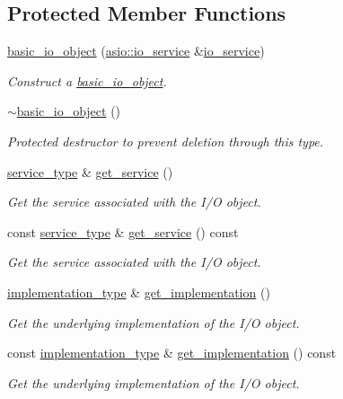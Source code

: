 \subsection*{Protected Member Functions}
\begin{DoxyCompactItemize}
\item 
\hyperlink{classasio_1_1basic__io__object_a26110041bd224aef06f6188ade817435}{basic\+\_\+io\+\_\+object} (\hyperlink{classasio_1_1io__service}{asio\+::io\+\_\+service} \&\hyperlink{classasio_1_1io__service}{io\+\_\+service})
\begin{DoxyCompactList}\small\item\em Construct a \hyperlink{classasio_1_1basic__io__object}{basic\+\_\+io\+\_\+object}. \end{DoxyCompactList}\item 
\hyperlink{classasio_1_1basic__io__object_a6e7f2677243fe2865ced9e795647583e}{$\sim$basic\+\_\+io\+\_\+object} ()
\begin{DoxyCompactList}\small\item\em Protected destructor to prevent deletion through this type. \end{DoxyCompactList}\item 
\hyperlink{classasio_1_1basic__io__object_aee6c059b568e190966f1307cc21a264d}{service\+\_\+type} \& \hyperlink{classasio_1_1basic__io__object_a853f5f5ae3c6d87bbef49b18006f0b24}{get\+\_\+service} ()
\begin{DoxyCompactList}\small\item\em Get the service associated with the I/\+O object. \end{DoxyCompactList}\item 
const \hyperlink{classasio_1_1basic__io__object_aee6c059b568e190966f1307cc21a264d}{service\+\_\+type} \& \hyperlink{classasio_1_1basic__io__object_a783a783d8bd43cd9ab3df0eed322afe9}{get\+\_\+service} () const 
\begin{DoxyCompactList}\small\item\em Get the service associated with the I/\+O object. \end{DoxyCompactList}\item 
\hyperlink{classasio_1_1basic__io__object_a36e6f136c8c1249242e81597c34d8d29}{implementation\+\_\+type} \& \hyperlink{classasio_1_1basic__io__object_a5e8d7cd4015ae160fda3ee8841a4307f}{get\+\_\+implementation} ()
\begin{DoxyCompactList}\small\item\em Get the underlying implementation of the I/\+O object. \end{DoxyCompactList}\item 
const \hyperlink{classasio_1_1basic__io__object_a36e6f136c8c1249242e81597c34d8d29}{implementation\+\_\+type} \& \hyperlink{classasio_1_1basic__io__object_a81fea7febd80d8b52ce867d14a8fb0f8}{get\+\_\+implementation} () const 
\begin{DoxyCompactList}\small\item\em Get the underlying implementation of the I/\+O object. \end{DoxyCompactList}\end{DoxyCompactItemize}
